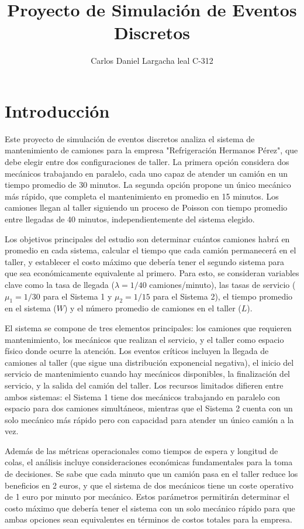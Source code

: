 \documentclass[a4paper, 12pt]{article}
\title{Proyecto de Simulación de Eventos Discretos}
\author{Carlos Daniel Largacha leal C-312}
\date{}
\begin{document}
	
	\maketitle
	
	\section{Introducción}
	
	Este proyecto de simulación de eventos discretos analiza el sistema de mantenimiento de camiones para la empresa "Refrigeración Hermanos Pérez", que debe elegir entre dos configuraciones de taller. La primera opción considera dos mecánicos trabajando en paralelo, cada uno capaz de atender un camión en un tiempo promedio de 30 minutos. La segunda opción propone un único mecánico más rápido, que completa el mantenimiento en promedio en 15 minutos. Los camiones llegan al taller siguiendo un proceso de Poisson con tiempo promedio entre llegadas de 40 minutos, independientemente del sistema elegido.
	
	Los objetivos principales del estudio son determinar cuántos camiones habrá en promedio en cada sistema, calcular el tiempo que cada camión permanecerá en el taller, y establecer el costo máximo que debería tener el segundo sistema para que sea económicamente equivalente al primero. Para esto, se consideran variables clave como la tasa de llegada ($\lambda = 1/40$ camiones/minuto), las tasas de servicio ($\mu_1 = 1/30$ para el Sistema 1 y $\mu_2 = 1/15$ para el Sistema 2), el tiempo promedio en el sistema ($W$) y el número promedio de camiones en el taller ($L$).
	
	El sistema se compone de tres elementos principales: los camiones que requieren mantenimiento, los mecánicos que realizan el servicio, y el taller como espacio físico donde ocurre la atención. Los eventos críticos incluyen la llegada de camiones al taller (que sigue una distribución exponencial negativa), el inicio del servicio de mantenimiento cuando hay mecánicos disponibles, la finalización del servicio, y la salida del camión del taller. Los recursos limitados difieren entre ambos sistemas: el Sistema 1 tiene dos mecánicos trabajando en paralelo con espacio para dos camiones simultáneos, mientras que el Sistema 2 cuenta con un solo mecánico más rápido pero con capacidad para atender un único camión a la vez.
	
	Además de las métricas operacionales como tiempos de espera y longitud de colas, el análisis incluye consideraciones económicas fundamentales para la toma de decisiones. Se sabe que cada minuto que un camión pasa en el taller reduce los beneficios en 2 euros, y que el sistema de dos mecánicos tiene un coste operativo de 1 euro por minuto por mecánico. Estos parámetros permitirán determinar el costo máximo que debería tener el sistema con un solo mecánico rápido para que ambas opciones sean equivalentes en términos de costos totales para la empresa.
	
\end{document}
